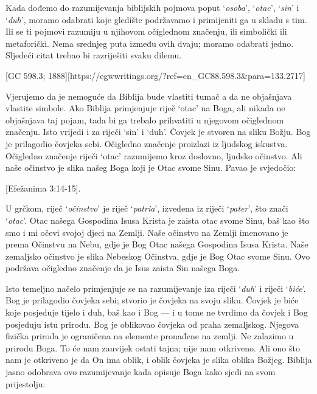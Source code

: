 Kada dođemo do razumijevanja biblijskih pojmova poput ‘\textit{osoba}’, ‘\textit{otac}’, ‘\textit{sin}’ i ‘\textit{duh}’, moramo odabrati koje gledište podržavamo i primijeniti ga u skladu s tim. Ili se ti pojmovi razumiju u njihovom očiglednom značenju, ili simbolički ili metaforički. Nema srednjeg puta između ovih dvaju; moramo odabrati jedno. Sljedeći citat trebao bi razriješiti svaku dilemu.


[GC 598.3; 1888][https://egwwritings.org/?ref=en\_GC88.598.3&para=133.2717]

Vjerujemo da je nemoguće da Biblija bude vlastiti tumač a da ne objašnjava vlastite simbole. Ako Biblija primjenjuje riječ ‘otac’ na Boga, ali nikada ne objašnjava taj pojam, tada bi ga trebalo prihvatiti u njegovom očiglednom značenju. Isto vrijedi i za riječi ‘sin’ i ‘duh’. Čovjek je stvoren na sliku Božju. Bog je prilagodio čovjeka sebi. Očigledno značenje proizlazi iz ljudskog iskustva. Očigledno značenje riječi ‘otac’ razumijemo kroz doslovno, ljudsko očinstvo. Ali naše očinstvo je slika našeg Boga koji je Otac svome Sinu. Pavao je svjedočio:

[Efežanima 3:14-15].

U grčkom, riječ ‘\textit{očinstvo}’ je riječ ‘\textit{patria}’, izvedena iz riječi ‘\textit{pater}’, što znači ‘\textit{otac}’. Otac našega Gospodina Isusa Krista je zaista otac svome Sinu, baš kao što smo i mi očevi svojoj djeci na Zemlji. Naše očinstvo na Zemlji imenovano je prema Očinstvu na Nebu, gdje je Bog Otac našega Gospodina Isusa Krista. Naše zemaljsko očinstvo je slika Nebeskog Očinstva, gdje je Bog Otac svome Sinu. Ovo podržava očigledno značenje da je Isus zaista Sin našega Boga.

Isto temeljno načelo primjenjuje se na razumijevanje iza riječi ‘\textit{duh}’ i riječi ‘\textit{biće}’. Bog je prilagodio čovjeka sebi; stvorio je čovjeka na svoju sliku. Čovjek je biće koje posjeduje tijelo i duh, baš kao i Bog — i u tome ne tvrdimo da čovjek i Bog posjeduju istu prirodu. Bog je oblikovao čovjeka od praha zemaljskog. Njegova fizička priroda je ograničena na elemente pronađene na zemlji. Ne zalazimo u prirodu Boga. To će nam zauvijek ostati tajna; nije nam otkriveno. Ali ono što nam je otkriveno je da On ima oblik, i oblik čovjeka je slika oblika Božjeg. Biblija jasno odobrava ovo razumijevanje kada opisuje Boga kako sjedi na svom prijestolju:

